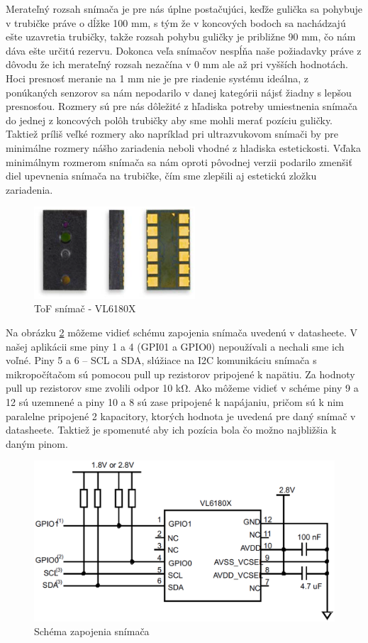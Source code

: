 Merateľný rozsah snímača je pre nás úplne postačujúci, keďže gulička sa pohybuje v trubičke práve o dĺžke 100 mm, s tým že v koncových bodoch sa nachádzajú ešte uzavretia trubičky, takže rozsah pohybu guličky je približne 90 mm, čo nám dáva ešte určitú rezervu. Dokonca veľa snímačov nespĺňa naše požiadavky práve z dôvodu že ich merateľný rozsah nezačína v 0 mm ale až pri vyšších hodnotách. Hoci presnosť meranie na 1 mm nie je pre riadenie systému ideálna, z ponúkaných senzorov sa nám nepodarilo v danej kategórii nájsť žiadny s lepšou presnosťou. Rozmery sú pre nás dôležité z hľadiska potreby umiestnenia snímača do jednej z koncových polôh trubičky aby sme mohli merať pozíciu guličky. Taktiež príliš veľké rozmery ako napríklad pri ultrazvukovom snímači by pre minimálne rozmery nášho zariadenia neboli vhodné z hladiska estetickosti. Vďaka minimálnym rozmerom snímača sa nám oproti pôvodnej verzii podarilo zmenšiť diel upevnenia snímača na trubičke, čím sme zlepšili aj estetickú zložku zariadenia.

\begin{figure}[]
	\centering
	\includegraphics[width=60mm]{obr/VL6180X.eps}
	\caption{ToF snímač - VL6180X\cite{VL6180X}}\label{OBRAZOK 2.2.3} 
\end{figure} 
Na obrázku \ref{OBRAZOK 2.2.4} môžeme vidieť schému zapojenia snímača uvedenú v datasheete. V našej aplikácii sme piny 1 a 4 (GPI01 a GPIO0) nepoužívali a nechali sme ich voľné. Piny 5 a 6 – SCL a SDA, slúžiace na I2C komunikáciu snímača s mikropočítačom sú pomocou pull up rezistorov pripojené k napätiu. Za hodnoty pull up rezistorov sme zvolili odpor 10 kΩ. Ako môžeme vidieť v schéme piny 9 a 12 sú uzemnené a piny 10 a 8 sú zase pripojené k napájaniu, pričom sú k nim paralelne pripojené 2 kapacitory, ktorých hodnota je uvedená pre daný snímač v datasheete. Taktiež je spomenuté aby ich pozícia bola čo možno najbližšia k daným pinom.   
\begin{figure}[]
	\centering
	\includegraphics[width=130mm]{obr/VL6180Xscheme.eps}
	\caption{Schéma zapojenia snímača \cite{VL6180X}}\label{OBRAZOK 2.2.4} 
\end{figure} 

